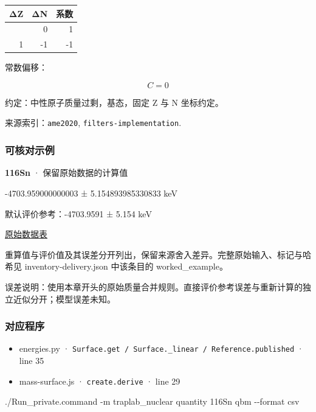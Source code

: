 \documentclass[
  11pt,
  letterpaper,
]{article}
\newenvironment{Shaded}{}{}
\newcommand{\AttributeTok}[1]{\textcolor[rgb]{0.49,0.56,0.16}{#1}}
\newcommand{\ExtensionTok}[1]{#1}
\newcommand{\NormalTok}[1]{#1}
\providecommand{\tightlist}{%
  \setlength{\itemsep}{0pt}\setlength{\parskip}{0pt}}
\begin{document}
\begin{longtable}[]{@{}rrr@{}}
\toprule\noalign{}
ΔZ & ΔN & 系数 \\
\midrule\noalign{}
\endhead
\bottomrule\noalign{}
\endlastfoot
0 & 0 & 1 \\
1 & -1 & -1 \\
\end{longtable}

常数偏移：

\[
C=0
\]

约定：中性原子质量过剩，基态，固定 Z 与 N 坐标约定。

来源索引：\texttt{ame2020}, \texttt{filters-implementation}.

\subsubsection{可核对示例}\label{ux53efux6838ux5bf9ux793aux4f8b-7}

\textbf{116Sn} · 保留原始数据的计算值

-4703.959000000003 ± 5.154893985330833 keV

默认评价参考：-4703.9591 ± 5.154 keV

\href{https://www-nds.iaea.org/amdc/ame2020/mass_1.mas20.txt}{原始数据表}

重算值与评价值及其误差分开列出，保留来源舍入差异。完整原始输入、标记与哈希见
inventory-delivery.json 中该条目的 worked\_example。

误差说明：使用本章开头的原始质量合并规则。直接评价参考误差与重新计算的独立近似分开；模型误差未知。

\subsubsection{对应程序}\label{ux5bf9ux5e94ux7a0bux5e8f-7}

\begin{itemize}
\tightlist
\item
  energies.py ·
  \texttt{Surface.get\ /\ Surface.\_linear\ /\ Reference.published} ·
  line 35
\item
  mass-surface.js · \texttt{create.derive} · line 29
\end{itemize}

\begin{Shaded}
\begin{Highlighting}[]
\ExtensionTok{./Run\_private.command} \AttributeTok{{-}m}\NormalTok{ traplab\_nuclear quantity 116Sn qbm }\AttributeTok{{-}{-}format}\NormalTok{ csv}
\end{Highlighting}
\end{Shaded}
\end{document}
